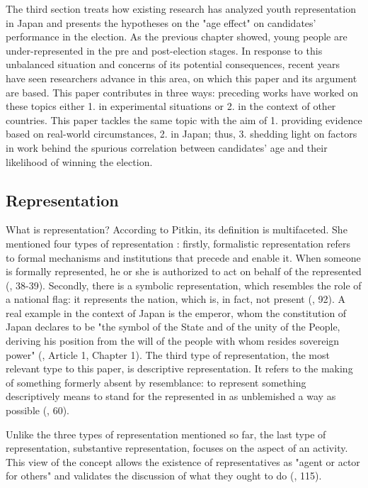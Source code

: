 \documentclass[a4paper, 12pt]{article}\usepackage[dvipdfmx]{graphicx}\usepackage[]{xcolor}
\begin{document}
The third section treats how existing research has analyzed youth representation in Japan and presents the hypotheses on the "age effect" on candidates' performance in the election. As the previous chapter showed, young people are under-represented in the pre and post-election stages. In response to this unbalanced situation and concerns of its potential consequences, recent years have seen researchers advance in this area, on which this paper and its argument are based. This paper contributes in three ways: preceding works have worked on these topics either 1. in experimental situations or 2. in the context of other countries. This paper tackles the same topic with the aim of 1. providing evidence based on real-world circumstances, 2. in Japan; thus, 3. shedding light on factors in work behind the spurious correlation between candidates' age and their likelihood of winning the election. 

\subsection{Representation} \label{ch3.1}

What is representation? According to Pitkin, its definition is multifaceted. She mentioned four types of representation \citep{pitkin1967concept}: firstly, formalistic representation refers to formal mechanisms and institutions that precede and enable it. When someone is formally represented, he or she is authorized to act on behalf of the represented (\citet{pitkin1967concept}, 38-39). 
Secondly, there is a symbolic representation, which resembles the role of a national flag: it represents the nation, which is, in fact, not present (\citet{pitkin1967concept}, 92). A real example in the context of Japan is the emperor, whom the constitution of Japan declares to be "the symbol of the State and of the unity of the People, deriving his position from the will of the people with whom resides sovereign power" (\citet{jpconst}, Article 1, Chapter 1). 
The third type of representation, the most relevant type to this paper, is descriptive representation. It refers to the making of something formerly absent by resemblance: to represent something descriptively means to stand for the represented in as unblemished a way as possible (\citet{pitkin1967concept}, 60). 

Unlike the three types of representation mentioned so far, the last type of representation, substantive representation, focuses on the aspect of an activity. This view of the concept allows the existence of representatives as "agent or actor for others" and validates the discussion of what they ought to do (\citet{pitkin1967concept}, 115). 
\end{document}
